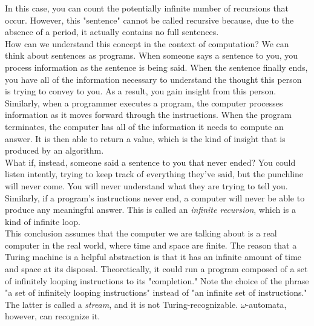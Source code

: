 \begin{tcolorbox}[breakable, enhanced, colback=textbook-blue, sharp corners]
	In this case, you can count the potentially infinite number of recursions that occur. However, this "sentence" cannot be called recursive because, due to the absence of a period, it actually contains no full sentences. \\
	
	How can we understand this concept in the context of computation? We can think about sentences as programs. When someone says a sentence to you, you process information as the sentence is being said. When the sentence finally ends, you have all of the information necessary to understand the thought this person is trying to convey to you. As a result, you gain insight from this person. Similarly, when a programmer executes a program, the computer processes information as it moves forward through the instructions. When the program terminates, the computer has all of the information it needs to compute an answer. It is then able to return a value, which is the kind of insight that is produced by an algorithm. \\
	
	What if, instead, someone said a sentence to you that never ended? You could listen intently, trying to keep track of everything they've said, but the punchline will never come. You will never understand what they are trying to tell you. Similarly, if a program's instructions never end, a computer will never be able to produce any meaningful answer. This is called an \textit{infinite recursion}, which is a kind of infinite loop. \\
	
	This conclusion assumes that the computer we are talking about is a real computer in the real world, where time and space are finite. The reason that a Turing machine is a helpful abstraction is that it has an infinite amount of time and space at its disposal. Theoretically, it could run a program composed of a set of infinitely looping instructions to its "completion." Note the choice of the phrase "a set of infinitely looping instructions" instead of "an infinite set of instructions." The latter is called a \textit{stream}, and it is not Turing-recognizable. $\omega$-automata, however, can recognize it. \\
	

\end{tcolorbox}
